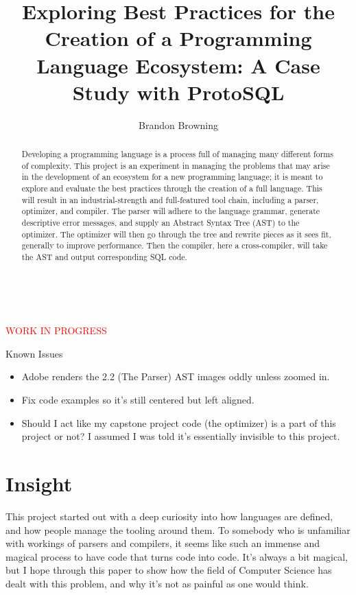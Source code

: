 \documentclass[titlepage]{article}
\begin{document}
	\thispagestyle{empty}
	\vspace*{\fill}
		~\centerline{\textcolor{red}{\Huge{WORK IN PROGRESS}}}
		\newline\newline

		\large{Known Issues}
		\begin{itemize}
			\item Adobe renders the 2.2 (The Parser) AST images oddly unless zoomed in.
			\item Fix code examples so it's still centered but left aligned.
			\item Should I act like my capstone project code (the optimizer) is a part of this project or not?  I assumed I was told it's essentially invisible to this project.
		\end{itemize}
	\vspace*{\fill}
	\newpage

	\title{Exploring Best Practices for the Creation of a Programming Language Ecosystem: A Case Study with ProtoSQL}
	\author{Brandon Browning}
	\maketitle

	\begin{abstract}

		Developing a programming language is a process full of managing many different forms of complexity.  This project is an experiment in managing the problems that may arise in the development of an ecosystem for a new programming language; it is meant to explore and evaluate the best practices through the creation of a full language.  This will result in an industrial-strength and full-featured tool chain, including a parser, optimizer, and compiler.  The parser will adhere to the language grammar, generate descriptive error messages, and supply an Abstract Syntax Tree (AST) to the optimizer.  The optimizer will then go through the tree and rewrite pieces as it sees fit, generally to improve performance.  Then the compiler, here a cross-compiler, will take the AST and output corresponding SQL code.

	\end{abstract}

	\section{Insight}

		This project started out with a deep curiosity into how languages are defined, and how people manage the tooling around them.  To somebody who is unfamiliar with workings of parsers and compilers, it seems like such an immense and magical process to have code that turns code into code.  It's always a bit magical, but I hope through this paper to show how the field of Computer Science has dealt with this problem, and why it's not as painful as one would think.
\end{document}
